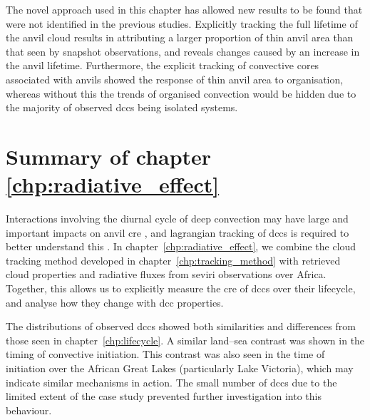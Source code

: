 The novel approach used in this chapter has allowed new results to be found that were not identified in the previous studies.
Explicitly tracking the full lifetime of the anvil cloud results in attributing a larger proportion of thin anvil area than that seen by snapshot observations, and reveals changes caused by an increase in the anvil lifetime.
Furthermore, the explicit tracking of convective cores associated with anvils showed the response of thin anvil area to organisation, whereas without this the trends of organised convection would be hidden due to the majority of observed \acrshort{dcc}s being isolated systems.




\section{Summary of chapter \ref{chp:radiative_effect}}

Interactions involving the diurnal cycle of deep convection may have large and important impacts on anvil \acrshort{cre} \citep{nowicki_observations_2004}, and lagrangian tracking of \acrshort{dcc}s is required to better understand this \citep{bouniol_macrophysical_2016}.
In chapter~\ref{chp:radiative_effect}, we combine the cloud tracking method developed in chapter~\ref{chp:tracking_method} with retrieved cloud properties and radiative fluxes from \acrshort{seviri} observations over Africa. 
Together, this allows us to explicitly measure the \acrshort{cre} of \acrshort{dcc}s over their lifecycle, and analyse how they change with \acrshort{dcc} properties.

The distributions of observed \acrshort{dcc}s showed both similarities and differences from those seen in chapter~\ref{chp:lifecycle}.
A similar land--sea contrast was shown in the timing of convective initiation.
This contrast was also seen in the time of initiation over the African Great Lakes (particularly Lake Victoria), which may indicate similar mechanisms in action.
The small number of \acrshort{dcc}s due to the limited extent of the case study prevented further investigation into this behaviour.

